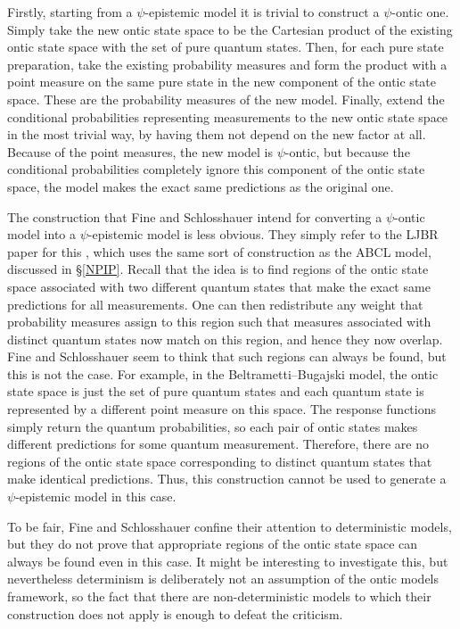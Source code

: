 \documentclass[DIV=calc,fontsize=12pt]{scrartcl} %
\theoremstyle{definition}
\theoremstyle{plain}
\begin{document}
Firstly, starting from a $\psi$-epistemic model it is trivial to
construct a $\psi$-ontic one.  Simply take the new ontic state space
to be the Cartesian product of the existing ontic state space with the
set of pure quantum states.  Then, for each pure state preparation,
take the existing probability measures and form the product with a
point measure on the same pure state in the new component of the ontic
state space.  These are the probability measures of the new model.
Finally, extend the conditional probabilities representing
measurements to the new ontic state space in the most trivial way, by
having them not depend on the new factor at all.  Because of the point
measures, the new model is $\psi$-ontic, but because the conditional
probabilities completely ignore this component of the ontic state
space, the model makes the exact same predictions as the original one.

The construction that Fine and Schlosshauer intend for converting a
$\psi$-ontic model into a $\psi$-epistemic model is less obvious.
They simply refer to the LJBR paper for this \cite{Lewis2012}, which
uses the same sort of construction as the ABCL model, discussed in
\S\ref{NPIP}.  Recall that the idea is to find regions of the ontic
state space associated with two different quantum states that make the
exact same predictions for all measurements.  One can then
redistribute any weight that probability measures assign to this
region such that measures associated with distinct quantum states now
match on this region, and hence they now overlap.  Fine and
Schlosshauer seem to think that such regions can always be found, but
this is not the case.  For example, in the Beltrametti--Bugajski model,
the ontic state space is just the set of pure quantum states and each
quantum state is represented by a different point measure on this
space.  The response functions simply return the quantum
probabilities, so each pair of ontic states makes different
predictions for some quantum measurement.  Therefore, there are no
regions of the ontic state space corresponding to distinct quantum
states that make identical predictions.  Thus, this construction
cannot be used to generate a $\psi$-epistemic model in this case.

To be fair, Fine and Schlosshauer confine their attention to
deterministic models, but they do not prove that appropriate regions
of the ontic state space can always be found even in this case.  It
might be interesting to investigate this, but nevertheless determinism
is deliberately not an assumption of the ontic models framework, so
the fact that there are non-deterministic models to which their
construction does not apply is enough to defeat the criticism.
\end{document}
